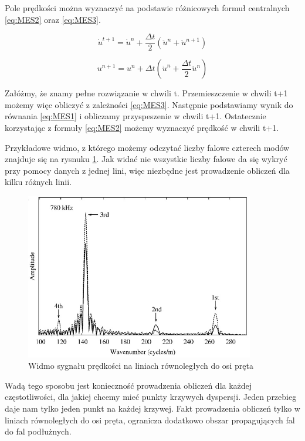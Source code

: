 Pole prędkości można wyznaczyć na podstawie różnicowych formuł centralnych \ref{eq:MES2} oraz \ref{eq:MES3}.

\begin{equation} \label{eq:MES2}
\dot u^{t+1} = \dot u^n + \frac{\Delta t}{2}(\ddot u^n + \ddot u^{n+1})
\end{equation}

\begin{equation} \label{eq:MES3}
u^{n+1} = u^n + \Delta t(\dot u^n + \frac{\Delta t}{2}\ddot u^n)
\end{equation}

Załóżmy, że znamy pełne rozwiązanie w chwili t. Przemieszczenie w chwili t+1 możemy więc obliczyć z zależności \ref{eq:MES3}. Następnie podstawiamy wynik do równania \ref{eq:MES1} i obliczamy przyspeszenie w chwili t+1. Ostatecznie korzystając z formuły \ref{eq:MES2} możemy wyznaczyć prędkość w chwili t+1.

Przykładowe widmo, z którego możemy odczytać liczby falowe czterech modów znajduje się na rysnuku \ref{fig:widmo_wymuszenie1}. Jak widać nie wszystkie liczby falowe da się wykryć przy pomocy danych z jednej lini, więc niezbędne jest prowadzenie obliczeń dla kilku różnych linii.

\begin{figure}[h]
\centering
\includegraphics[width=10cm]{Zdjecia/2/widmo_wymuszenia_waskopasmowe}
\caption{Widmo sygnału prędkości na liniach równoległych do osi pręta \cite{bartek_valsamos}}
\label{fig:widmo_wymuszenie1}
\end{figure}

Wadą tego sposobu jest konieczność prowadzenia obliczeń dla każdej częstotliwości, dla jakiej chcemy mieć punkty krzywych dyspersji. Jeden przebieg daje nam tylko jeden punkt na każdej krzywej. Fakt prowadzenia obliczeń tylko w liniach równoległych do osi pręta, ogranicza dodatkowo obszar propagujących fal do fal podłużnych.

